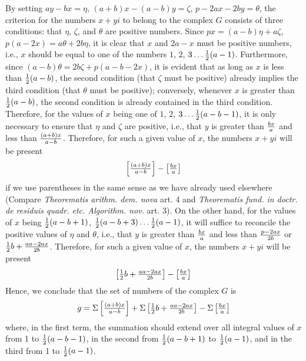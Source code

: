 \documentclass[twoside,12pt, showframe]{memoir}
\let\oldfrac\frac
\def\frac#1#2{\mathchoice{\tfrac{#1}{#2}}{\oldfrac{#1}{#2}}{\genfrac{}{}{}{2}{#1}{#2\mathstrut}}{\genfrac{}{}{}{3}{#1}{#2\mathstrut}}}
\begin{document}
By setting \(a y-b x=\eta\), \((a+b) x-(a-b) y=\zeta\), \(p-2 a x-2 b y=\theta\), the criterion for the numbers \(x+yi\) to belong to the complex \(G\) consists of three conditions: that \(\eta\), \(\zeta\), and \(\theta\) are positive numbers. Since \(p x=(a-b) \eta+a \zeta\), \(p(a-2 x)=a \theta+2 b \eta\), it is clear that \(x\) and \(2a-x\) must be positive numbers, i.e., \(x\) should be equal to one of the numbers \(1\), \(2\), \(3\ldots \frac{1}{2}(a-1)\). Furthermore, since \((a-b) \theta=2 b \zeta+p(a-b-2 x)\), it is evident that as long as \(x\) is less than \(\frac{1}{2}(a-b)\), the second condition (that \(\zeta\) must be positive) already implies the third condition (that \(\theta\) must be positive); conversely, whenever \(x\) is greater than \(\frac{1}{2}(a-b)\), the second condition is already contained in the third condition. Therefore, for the values of \(x\) being one of \(1\), \(2\), \(3\ldots \frac{1}{2}(a-b-1)\), it is only necessary to ensure that \(\eta\) and \(\zeta\) are positive, i.e., that \(y\) is greater than \(\frac{b x}{a}\) and less than \(\frac{(a+b) x}{a-b}\). Therefore, for such a given value of \(x\), the numbers \(x+yi\) will be present
\[\left[\frac{(a+b) x}{a-b}\right]-\left[\frac{b x}{a}\right]\]
if we use parentheses in the same sense as we have already used elsewhere (Compare \textit{Theorematis arithm. dem. nova} art. 4 and \textit{Theorematis fund. in doctr. de residuis quadr. etc. Algorithm. nov.} art. 3). On the other hand, for the values of \(x\) being \(\frac{1}{2}(a-b+1)\), \(\frac{1}{2}(a-b+3)\ldots \frac{1}{2}(a-1)\), it will suffice to reconcile the positive values of \(\eta\) and \(\theta\), i.e., that \(y\) is greater than \(\frac{b x}{a}\) and less than \(\frac{p-2 a x}{2 b}\) or \(\frac{1}{2} b+\frac{a a-2 a x}{2 b}\). Therefore, for such a given value of \(x\), the numbers \(x+yi\) will be present
\[\left[\frac{1}{2} b+\frac{a a-2 a x}{2 b}\right]-\left[\frac{b x}{a}\right]\]
Hence, we conclude that the set of numbers of the complex \(G\) is
\[g=\Sigma\left[\frac{(a+b) x}{a-b}\right]+\Sigma\left[\frac{1}{2} b+\frac{a a-2 a x}{2 b}\right]-\Sigma\left[\frac{b x}{a}\right]\]
where, in the first term, the summation should extend over all integral values of \(x\) from 1 to \(\frac{1}{2}(a-b-1)\), in the second from \(\frac{1}{2}(a-b+1)\) to \(\frac{1}{2}(a-1)\), and in the third from 1 to \(\frac{1}{2}(a-1)\).
%
\end{document}
